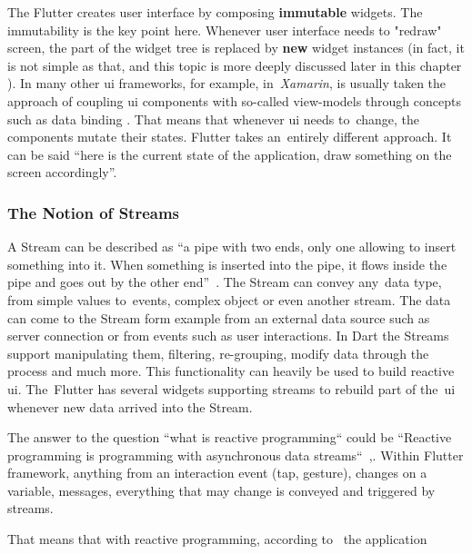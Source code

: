 The Flutter creates user interface by composing \textbf{immutable} widgets. The immutability is the key point here. Whenever user interface needs to "redraw" screen, the part of the widget tree is replaced by \textbf{new} widget instances (in fact, it is not simple as that, and this topic is more deeply discussed later in this chapter ).  In many other \gls{ui} frameworks, for example, in~\textit{Xamarin}, is usually taken the approach of coupling \gls{ui} components with so-called view-models through concepts such as data binding . That means that whenever \gls{ui} needs to~change, the components mutate their states. Flutter takes an~entirely different approach. It can be said ``here is the current state of the application, draw something on the screen accordingly''.

\subsubsection{The Notion of Streams}
A Stream can be described as ``a pipe with two ends, only one allowing to insert something into it. When something is inserted into the pipe, it flows inside the pipe and goes out by the other end''~\cite{reactive-didier}. The Stream can convey any~data type, from simple values to~events, complex object or even another stream. The data can come to the Stream form example from an external data source such as server connection or from events such as user interactions. In Dart the Streams support manipulating them, filtering, re-grouping, modify data through the process and much more. This functionality can heavily be used to build reactive \gls{ui}. The~Flutter has several widgets supporting streams to rebuild part of the~\gls{ui} whenever new data arrived into the Stream.

The answer to the question ``what is reactive programming`` could be ``Reactive programming is programming with asynchronous data streams``~\cite{reactive-didier},\cite{reactive-red-hat}. Within Flutter framework, anything from an interaction event (tap, gesture), changes on a variable, messages, everything that may change is conveyed and triggered by streams.

That means that with reactive programming, according to~\cite{reactive-didier} the application 

